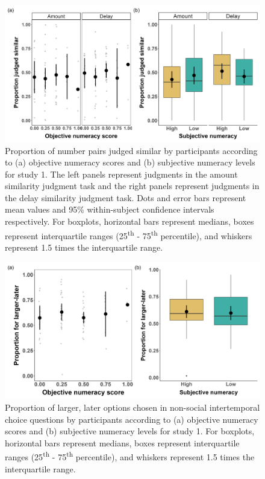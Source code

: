 \documentclass[
  doc,floatsintext]{apa6}
\begin{document}
\begin{figure}
\includegraphics[width=1\linewidth]{figures/numeracy_judgments_1} \caption{Proportion of number pairs judged similar by participants according to (a) objective numeracy scores and (b) subjective numeracy levels for study 1. The left panels represent judgments in the amount similarity judgment task and the right panels represent judgments in the delay similarity judgment task. Dots and error bars represent mean values and 95\% within-subject confidence intervals respectively. For boxplots, horizontal bars represent medians, boxes represent interquartile ranges (25\textsuperscript{th} - 75\textsuperscript{th} percentile), and whiskers represent 1.5 times the interquartile range.}\label{fig:numeracyjudgments1}
\end{figure}



\begin{figure}
\includegraphics[width=1\linewidth]{figures/numeracy_itc_1} \caption{Proportion of larger, later options chosen in non-social intertemporal choice questions by participants according to (a) objective numeracy scores and (b) subjective numeracy levels for study 1. For boxplots, horizontal bars represent medians, boxes represent interquartile ranges (25\textsuperscript{th} - 75\textsuperscript{th} percentile), and whiskers represent 1.5 times the interquartile range.}\label{fig:numeracyitc1}
\end{figure}
\end{document}
